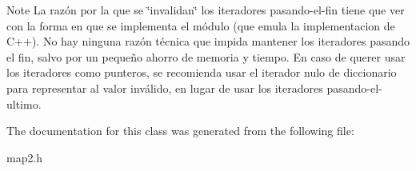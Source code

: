 \begin{DoxyNote}{\-Note}
\-La razón por la que se \char`\"{}invalidan\char`\"{} los iteradores pasando-\/el-\/fin tiene que ver con la forma en que se implementa el módulo (que emula la implementacion de \-C++). \-No hay ninguna razón técnica que impida mantener los iteradores pasando el fin, salvo por un pequeño ahorro de memoria y tiempo. \-En caso de querer usar los iteradores como punteros, se recomienda usar el iterador nulo de diccionario para representar al valor inválido, en lugar de usar los iteradores pasando-\/el-\/ultimo. 
\end{DoxyNote}


\-The documentation for this class was generated from the following file\-:\begin{DoxyCompactItemize}
\item 
map2.\-h\end{DoxyCompactItemize}
